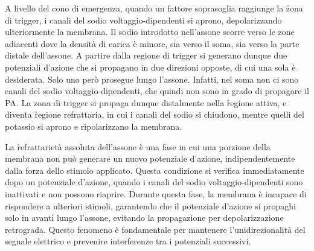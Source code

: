 A livello del cono di emergenza, quando un fattore soprasoglia raggiunge la \h{zona di trigger}, i canali del sodio voltaggio-dipendenti si aprono, depolarizzando ulteriormente la membrana. Il sodio introdotto nell'assone scorre verso le zone adiacenti dove la densità di carica è minore, sia verso il soma, sia verso la parte distale dell'assone. A partire dalla regione di trigger si generano dunque due potenziali d’azione che si propagano in due direzioni opposte, di cui una sola è desiderata. Solo uno però prosegue lungo l'assone. Infatti, nel soma non ci sono canali del sodio voltaggio-dipendenti, che quindi non sono in grado di propagare il PA. La zona di trigger si propaga dunque distalmente nella \h{regione attiva}, e diventa \h{regione refrattaria}, in cui i canali del sodio si chiudono, mentre quelli del potassio si aprono e ripolarizzano la membrana.

La \h{refrattarietà assoluta} dell'assone è una fase in cui una porzione della membrana non può generare un nuovo potenziale d'azione, indipendentemente dalla forza dello stimolo applicato. Questa condizione si verifica immediatamente dopo un potenziale d'azione, quando i canali del sodio voltaggio-dipendenti sono inattivati e non possono riaprire. Durante questa fase, la membrana è incapace di rispondere a ulteriori stimoli, garantendo che il potenziale d'azione si propaghi solo in avanti lungo l'assone, evitando la propagazione per depolarizzazione retrograda. Questo fenomeno è fondamentale per mantenere l'unidirezionalità del segnale elettrico e prevenire interferenze tra i potenziali successivi.


